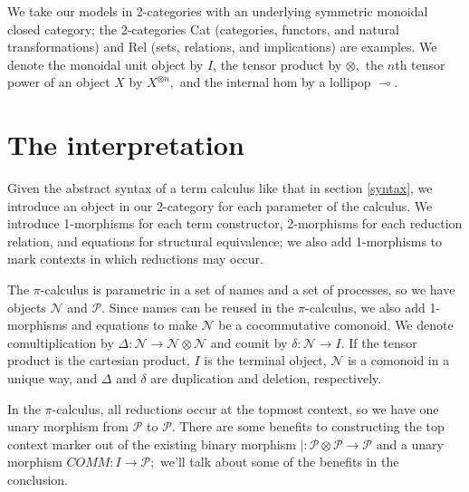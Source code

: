 \documentclass[]{acm_proc_article-sp}
\newcommand{\maps}{\colon}
\numberwithin{equation}{subsection}
\newcommand{\pic}{$\pi$-calculus}
\begin{document}
We take our models in 2-categories with an underlying symmetric monoidal closed category; the 2-categories Cat (categories, functors, and natural transformations) and Rel (sets, relations, and implications) are examples.  We denote the monoidal unit object by $I$, the tensor product by $\otimes,$ the $n$th tensor power of an object $X$ by $X^{\otimes n},$ and the internal hom by a lollipop $\multimap$.

\section{The interpretation}

Given the abstract syntax of a term calculus like that in section \ref{syntax}, we introduce an object in our 2-category for each parameter of the calculus.  We introduce 1-morphisms for each term constructor, 2-morphisms for each reduction relation, and equations for structural equivalence; we also add 1-morphisms to mark contexts in which reductions may occur.

The {\pic} is parametric in a set of names and a set of processes, so we have objects $\mathcal{N}$ and $\mathcal{P}$.  Since names can be reused in the {\pic,} we also add 1-morphisms and equations to make $\mathcal{N}$ be a cocommutative comonoid.  We denote comultiplication by $\Delta\maps \mathcal{N} \to \mathcal{N} \otimes \mathcal{N}$ and counit by $\delta\maps \mathcal{N} \to I.$  If the tensor product is the cartesian product, $I$ is the terminal object, $\mathcal{N}$ is a comonoid in a unique way, and $\Delta$ and $\delta$ are duplication and deletion, respectively.

In the {\pic,} all reductions occur at the topmost context, so we have one unary morphism from $\mathcal{P}$ to $\mathcal{P}$.  There are some benefits to constructing the top context marker out of the existing binary morphism $|\maps \mathcal{P} \otimes \mathcal{P} \to \mathcal{P}$ and a unary morphism $COMM\maps I \to \mathcal{P};$ we'll talk about some of the benefits in the conclusion.
\end{document}
